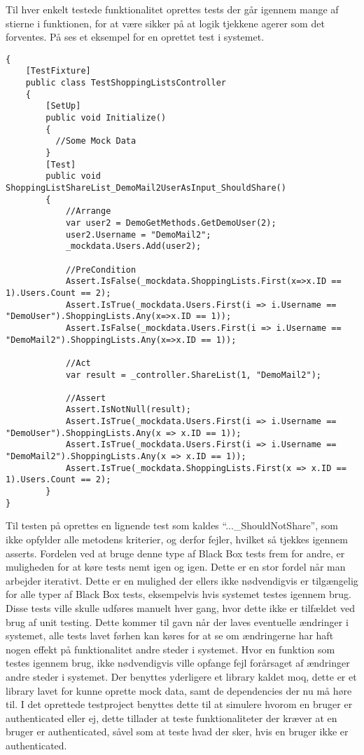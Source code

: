 Til hver enkelt testede funktionalitet oprettes tests der går igennem mange af stierne i funktionen, for at være sikker på at logik tjekkene agerer som det forventes.
På  ses et eksempel for en oprettet test i systemet.

\begin{lstlisting}[caption="En test for ``ShareList'' metoden i ``ShoppingListController''\, heri tjekkes hvorom den User listen deles med\, får listen sat ind på sin liste over ShoppingLists\, samt at ShoppingListen får tilføjet endnu en user.", label=lsttest]
{
    [TestFixture]
    public class TestShoppingListsController
    {
    	[SetUp]
        public void Initialize()
        {
          //Some Mock Data
        }
        [Test]
        public void ShoppingListShareList_DemoMail2UserAsInput_ShouldShare()
        {
            //Arrange
            var user2 = DemoGetMethods.GetDemoUser(2);
            user2.Username = "DemoMail2";
            _mockdata.Users.Add(user2); 

            //PreCondition
            Assert.IsFalse(_mockdata.ShoppingLists.First(x=>x.ID == 1).Users.Count == 2);
            Assert.IsTrue(_mockdata.Users.First(i => i.Username == "DemoUser").ShoppingLists.Any(x=>x.ID == 1));
            Assert.IsFalse(_mockdata.Users.First(i => i.Username == "DemoMail2").ShoppingLists.Any(x=>x.ID == 1));

            //Act
            var result = _controller.ShareList(1, "DemoMail2");

            //Assert
            Assert.IsNotNull(result);
            Assert.IsTrue(_mockdata.Users.First(i => i.Username == "DemoUser").ShoppingLists.Any(x => x.ID == 1));
            Assert.IsTrue(_mockdata.Users.First(i => i.Username == "DemoMail2").ShoppingLists.Any(x => x.ID == 1));
            Assert.IsTrue(_mockdata.ShoppingLists.First(x => x.ID == 1).Users.Count == 2);
        }
}        
\end{lstlisting}
Til testen på  oprettes en lignende test som kaldes ``...\_ShouldNotShare'', som ikke opfylder alle metodens kriterier, og derfor fejler, hvilket så tjekkes igennem asserts.
Fordelen ved at bruge denne type af Black Box tests frem for andre, er muligheden for at køre tests nemt igen og igen.
Dette er en stor fordel når man arbejder iterativt.
Dette er en mulighed der ellers ikke nødvendigvis er tilgængelig for alle typer af Black Box tests, eksempelvis hvis systemet testes igennem brug.
Disse tests ville skulle udføres manuelt hver gang, hvor dette ikke er tilfældet ved brug af unit testing.
Dette kommer til gavn når der laves eventuelle ændringer i systemet, alle tests lavet førhen kan køres for at se om ændringerne har haft nogen effekt på funktionalitet andre steder i systemet. 
Hvor en funktion som testes igennem brug, ikke nødvendigvis ville opfange fejl forårsaget af ændringer andre steder i systemet.
Der benyttes yderligere et library kaldet moq, dette er et library lavet for kunne oprette mock data, samt de dependencies der nu må høre til.
I det oprettede testproject benyttes dette til at simulere hvorom en bruger er authenticated eller ej, dette tillader at teste funktionaliteter der kræver at en bruger er authenticated, såvel som at teste hvad der sker, hvis en bruger ikke er authenticated.

